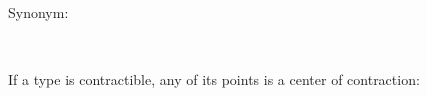 Synonym:

\begin{code}%
\>[0]\AgdaSpace{}%
\AgdaSymbol{=}\AgdaSpace{}%
\<%
\\
\>[0]\AgdaSpace{}%
\AgdaSymbol{=}\AgdaSpace{}%
\<%
\end{code}

If a type is contractible, any of its points is a center of contraction:

\begin{code}%
\>[0]\<%
\\
\>[0][@{}l@{\AgdaIndent{0}}]%
\>[2]\AgdaSymbol{:}\AgdaSpace{}%
\AgdaSpace{}%
\AgdaSymbol{\{}\AgdaSymbol{\}}\AgdaSpace{}%
\AgdaSymbol{\{}\AgdaSpace{}%
\AgdaSymbol{:}\AgdaSpace{}%
\AgdaSpace{}%
\AgdaSymbol{\}}\<%
\\
%
\>[2]\AgdaSpace{}%
\AgdaSymbol{(}\AgdaSpace{}%
\AgdaSymbol{:}\AgdaSpace{}%
\AgdaSymbol{)}\AgdaSpace{}%
\AgdaSpace{}%
\AgdaSymbol{(}\AgdaSpace{}%
\AgdaSymbol{:}\AgdaSpace{}%
\AgdaSymbol{(}\AgdaSpace{}%
\AgdaSymbol{:}\AgdaSpace{}%
\AgdaSymbol{)}\AgdaSpace{}%
\AgdaSpace{}%
\AgdaSpace{}%
\AgdaOperator{\AgdaDatatype{==}}\AgdaSpace{}%
\AgdaSymbol{)}\<%
\\
%
\>[2]\AgdaSpace{}%
\AgdaSpace{}%
\AgdaSymbol{(}\AgdaSpace{}%
\AgdaSymbol{:}\AgdaSpace{}%
\AgdaSymbol{)}\AgdaSpace{}%
\AgdaSpace{}%
\AgdaSpace{}%
\AgdaSymbol{(}\AgdaSpace{}%
\AgdaSymbol{:}\AgdaSpace{}%
\AgdaSymbol{)}\AgdaSpace{}%
\AgdaSpace{}%
\AgdaSpace{}%
\AgdaOperator{\AgdaDatatype{==}}\AgdaSpace{}%
\AgdaSymbol{))}\<%
\\
%
\\[\AgdaEmptyExtraSkip]%
\>[0]\AgdaSpace{}%
\AgdaSpace{}%
\AgdaSpace{}%
\AgdaSpace{}%
\AgdaSpace{}%
\AgdaSymbol{=}\AgdaSpace{}%
\AgdaSpace{}%
\AgdaSymbol{(}\AgdaSpace{}%
\AgdaSymbol{)}\AgdaSpace{}%
\AgdaSpace{}%
\AgdaSymbol{(}\AgdaSpace{}%
\AgdaSymbol{)}\<%
\end{code}

